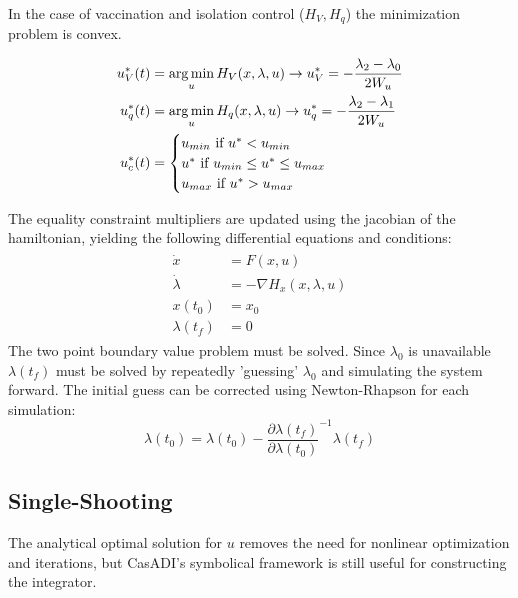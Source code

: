 In the case of vaccination and isolation control ($H_V, H_q$) the minimization problem is convex.

\begin{align}
    u^*_V(t) &= \operatorname*{arg\,min}_u H_{V}(x, \lambda, u)\rightarrow u^*_V = -\frac{\lambda_2-\lambda_0}{2W_u}\\
    u^*_q(t) &= \operatorname*{arg\,min}_u H_{q}(x, \lambda, u)\rightarrow u^*_q = -\frac{\lambda_2 - \lambda_1}{2W_u}\\
    u_{c}^*(t) &= \begin{cases}
    u_{min} \mbox{ if } u^* < u_{min}\\
    u^* \mbox{ if } u_{min} \leq u^* \leq u_{max}\\
    u_{max}  \mbox{ if } u^* > u_{max}\\
    \end{cases}
\end{align}

The equality constraint multipliers are updated using the jacobian of the hamiltonian, yielding the following differential equations and conditions:
\begin{align}
    \begin{split}
    \dot{x} &= F(x, u)\\
    \dot{\lambda} &= -\nabla H_x(x, \lambda, u)\\
    x(t_0) &= x_0\\
    \lambda(t_f) &= 0
    \end{split}
\end{align}
The two point boundary value problem must be solved. Since $\lambda_0$ is unavailable $\lambda(t_f)$ must be solved by repeatedly 'guessing' $\lambda_0$ and simulating the system forward. The initial guess can be corrected using Newton-Rhapson for each simulation:
\begin{equation}
    \lambda(t_0) = \lambda(t_0) - \frac{\partial \lambda(t_f)}{\partial \lambda(t_0)}^{-1} \lambda(t_f)
\end{equation}

\subsection{Single-Shooting}
The analytical optimal solution for $u$ removes the need for nonlinear optimization and iterations, but CasADI's symbolical framework is still useful for constructing the integrator. 

